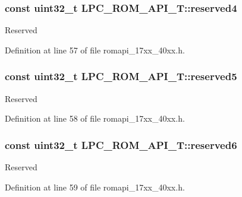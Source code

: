 \subsubsection[{\texorpdfstring{reserved4}{reserved4}}]{\setlength{\rightskip}{0pt plus 5cm}const uint32\+\_\+t L\+P\+C\+\_\+\+R\+O\+M\+\_\+\+A\+P\+I\+\_\+\+T\+::reserved4}\hypertarget{structLPC__ROM__API__T_a1d3193c8ed079cf1c5006dce51686598}{}\label{structLPC__ROM__API__T_a1d3193c8ed079cf1c5006dce51686598}
Reserved 

Definition at line 57 of file romapi\+\_\+17xx\+\_\+40xx.\+h.

\subsubsection[{\texorpdfstring{reserved5}{reserved5}}]{\setlength{\rightskip}{0pt plus 5cm}const uint32\+\_\+t L\+P\+C\+\_\+\+R\+O\+M\+\_\+\+A\+P\+I\+\_\+\+T\+::reserved5}\hypertarget{structLPC__ROM__API__T_a1e6687c757f30d286d1ae661c0863026}{}\label{structLPC__ROM__API__T_a1e6687c757f30d286d1ae661c0863026}
Reserved 

Definition at line 58 of file romapi\+\_\+17xx\+\_\+40xx.\+h.

\subsubsection[{\texorpdfstring{reserved6}{reserved6}}]{\setlength{\rightskip}{0pt plus 5cm}const uint32\+\_\+t L\+P\+C\+\_\+\+R\+O\+M\+\_\+\+A\+P\+I\+\_\+\+T\+::reserved6}\hypertarget{structLPC__ROM__API__T_a425b87f3b0f5ce258583e9e965829606}{}\label{structLPC__ROM__API__T_a425b87f3b0f5ce258583e9e965829606}
Reserved 

Definition at line 59 of file romapi\+\_\+17xx\+\_\+40xx.\+h.

